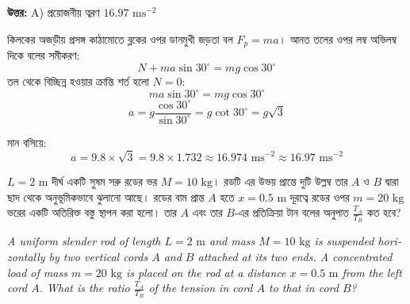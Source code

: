 \documentclass[12pt, a4paper]{article}
\begin{document}
\vspace{0.5em}
\begin{tcolorbox}[answerbox]
\textbf{\color{success} উত্তর:} A) প্রয়োজনীয় ত্বরণ $16.97\text{ ms}^{-2}$
\end{tcolorbox}
\vspace{1em}

\begin{tcolorbox}[solutionbox={সমাধান (Solution)}]
\noindent
কিলকের অজড়ীয় প্রসঙ্গ কাঠামোতে ব্লকের ওপর ডানমুখী জড়তা বল $F_p = m a$। 
আনত তলের ওপর লম্ব অভিলম্ব দিকে বলের সমীকরণ:
\[ N + m a \sin 30^\circ = m g \cos 30^\circ \]
তল থেকে বিচ্ছিন্ন হওয়ার ক্রান্তি শর্ত হলো $N = 0$:
\[ m a \sin 30^\circ = m g \cos 30^\circ \]
\[ a = g \frac{\cos 30^\circ}{\sin 30^\circ} = g \cot 30^\circ = g \sqrt{3} \]

মান বসিয়ে:
\[ a = 9.8 \times \sqrt{3} = 9.8 \times 1.732 \approx 16.974\text{ ms}^{-2} \approx 16.97\text{ ms}^{-2} \]
\end{tcolorbox}


\begin{tcolorbox}[questionbox={প্রশ্ন (Question) 17}]
\noindent
$L = 2\text{ m}$ দীর্ঘ একটি সুষম সরু রডের ভর $M = 10\text{ kg}$। রডটি এর উভয় প্রান্তে দুটি উল্লম্ব তার $A$ ও $B$ দ্বারা ছাদ থেকে অনুভূমিকভাবে ঝুলানো আছে। রডের বাম প্রান্ত $A$ হতে $x = 0.5\text{ m}$ দূরত্বে রডের ওপর $m = 20\text{ kg}$ ভরের একটি অতিরিক্ত বস্তু স্থাপন করা হলো। তার $A$ এবং তার $B$-এর প্রতিক্রিয়া টান বলের অনুপাত $\frac{T_A}{T_B}$ কত হবে?

\vspace{0.8em}
\begin{english}
\noindent\textit{\color{darkgray}
A uniform slender rod of length $L = 2\text{ m}$ and mass $M = 10\text{ kg}$ is suspended horizontally by two vertical cords $A$ and $B$ attached at its two ends. A concentrated load of mass $m = 20\text{ kg}$ is placed on the rod at a distance $x = 0.5\text{ m}$ from the left cord $A$. What is the ratio $\frac{T_A}{T_B}$ of the tension in cord $A$ to that in cord $B$?
}
\end{english}
\end{tcolorbox}
\end{document}
